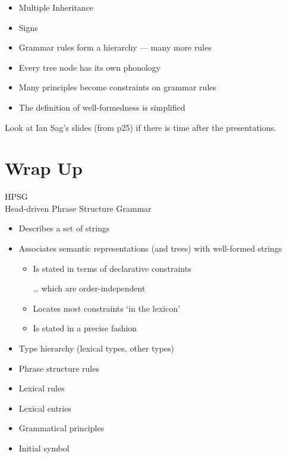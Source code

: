 \documentclass[a4paper,landscape,headrule,footrule]{foils}
\begin{document}

\begin{itemize}
\item Multiple Inheritance
\item Signs
\item Grammar rules form a hierarchy --- many more rules
\item Every tree node has its own phonology
\item Many principles become constraints on 
grammar rules
\item The definition of well-formedness is 
simplified
\end{itemize}

Look at Ian Sag's slides (from p25) if there is time after the presentations.



\section{Wrap Up}

\begin{center}
  \LARGE HPSG \\
  \Large Head-driven Phrase Structure Grammar  
\end{center}

\begin{itemize}
\item Describes a set of strings
\item Associates semantic representations (and
trees) with well-formed strings
\begin{itemize}
\item Is stated in terms of declarative constraints
\item[\ldots]  which are order-independent
\item Locates most constraints `in the lexicon'
\item Is stated in a precise fashion
\end{itemize}
\end{itemize}


\begin{itemize}
\item Type hierarchy (lexical types, other types)
\item Phrase structure rules
\item Lexical rules
\item Lexical entries
\item Grammatical principles
\item Initial symbol
\end{itemize}
\end{document}
